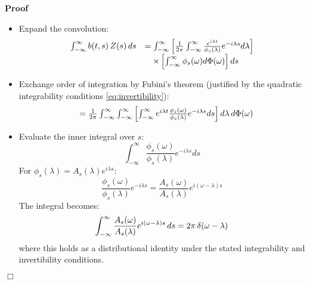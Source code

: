 \documentclass{article}
\newenvironment{proof}{\noindent\textbf{Proof\ }}{\hspace*{\fill}$\Box$\medskip}
\begin{document}
\begin{proof}
  \begin{itemize}
    \item \label{step:expand} Expand the convolution:
    \begin{equation}
      \begin{array}{ll}
        \int_{- \infty}^{\infty} b (t, s)  \hspace{0.17em} Z (s) 
        \hspace{0.17em} ds & = \int_{- \infty}^{\infty} \left[ \frac{1}{2 \pi}
        \int_{- \infty}^{\infty} \frac{e^{i \lambda t}}{\phi_s (\lambda)}
        e^{- i \lambda s} d \lambda \right]\\
        & \quad \times \left[ \int_{- \infty}^{\infty} \phi_s (\omega) d \Phi
        (\omega) \right] ds
      \end{array}
    \end{equation}
    \item \label{step:fubini} Exchange order of integration by Fubini's
    theorem (justified by the quadratic integrability conditions
    \eqref{eq:invertibility}):
    \begin{equation}
      \begin{array}{ll}
        & = \frac{1}{2 \pi}  \int_{- \infty}^{\infty} \int_{-
        \infty}^{\infty} \left[ \int_{- \infty}^{\infty} e^{i \lambda t} 
        \frac{\phi_s (\omega)}{\phi_s (\lambda)} e^{- i \lambda s} ds \right]
        d \lambda \hspace{0.17em} d \Phi (\omega)
      \end{array}
    \end{equation}
    \item \label{step:inner-integral} Evaluate the inner integral over $s$:
    \begin{equation}
      \int_{- \infty}^{\infty} \frac{\phi_s (\omega)}{\phi_s (\lambda)} e^{- i
      \lambda s} ds
    \end{equation}
    For $\phi_s (\lambda) = A_s (\lambda) e^{i \lambda s}$:
    \begin{equation}
      \frac{\phi_s (\omega)}{\phi_s (\lambda)} e^{- i \lambda s} = \frac{A_s
      (\omega)}{A_s (\lambda)} e^{i (\omega - \lambda) s}
    \end{equation}
    The integral becomes:
    \begin{equation}
      \label{eq:dirac-delta} \int_{- \infty}^{\infty} \frac{A_s (\omega)}{A_s
      (\lambda)} e^{i (\omega - \lambda) s}  \hspace{0.17em} ds = 2 \pi
      \hspace{0.17em} \delta (\omega - \lambda)
    \end{equation}
    where this holds as a distributional identity under the stated
    integrability and invertibility conditions.
    

\end{itemize}
\end{proof}
\end{document}

